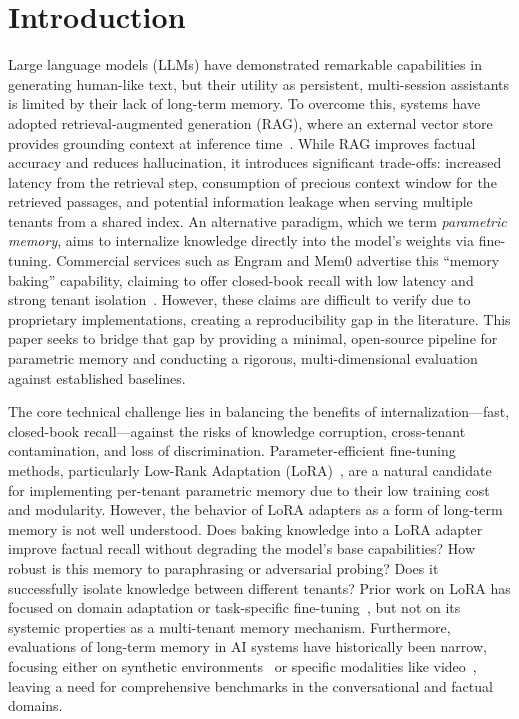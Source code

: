 \documentclass[conference]{IEEEtran}
\begin{document}
\section{Introduction}
Large language models (LLMs) have demonstrated remarkable capabilities in generating human-like text, but their utility as persistent, multi-session assistants is limited by their lack of long-term memory. To overcome this, systems have adopted retrieval-augmented generation (RAG), where an external vector store provides grounding context at inference time~\cite{lewis2020rag}. While RAG improves factual accuracy and reduces hallucination, it introduces significant trade-offs: increased latency from the retrieval step, consumption of precious context window for the retrieved passages, and potential information leakage when serving multiple tenants from a shared index. An alternative paradigm, which we term \textit{parametric memory}, aims to internalize knowledge directly into the model's weights via fine-tuning. Commercial services such as Engram and Mem0 advertise this ``memory baking'' capability, claiming to offer closed-book recall with low latency and strong tenant isolation~\cite{hazy2025cartridges, chhikara2025mem0}. However, these claims are difficult to verify due to proprietary implementations, creating a reproducibility gap in the literature. This paper seeks to bridge that gap by providing a minimal, open-source pipeline for parametric memory and conducting a rigorous, multi-dimensional evaluation against established baselines.

The core technical challenge lies in balancing the benefits of internalization---fast, closed-book recall---against the risks of knowledge corruption, cross-tenant contamination, and loss of discrimination. Parameter-efficient fine-tuning methods, particularly Low-Rank Adaptation (LoRA)~\cite{hu2022lora}, are a natural candidate for implementing per-tenant parametric memory due to their low training cost and modularity. However, the behavior of LoRA adapters as a form of long-term memory is not well understood. Does baking knowledge into a LoRA adapter improve factual recall without degrading the model's base capabilities? How robust is this memory to paraphrasing or adversarial probing? Does it successfully isolate knowledge between different tenants? Prior work on LoRA has focused on domain adaptation or task-specific fine-tuning~\cite{lialin2023peft, qvpareto2026}, but not on its systemic properties as a multi-tenant memory mechanism. Furthermore, evaluations of long-term memory in AI systems have historically been narrow, focusing either on synthetic environments~\cite{memorymaze2022pasukonis} or specific modalities like video~\cite{videomem2026}, leaving a need for comprehensive benchmarks in the conversational and factual domains.
\end{document}
